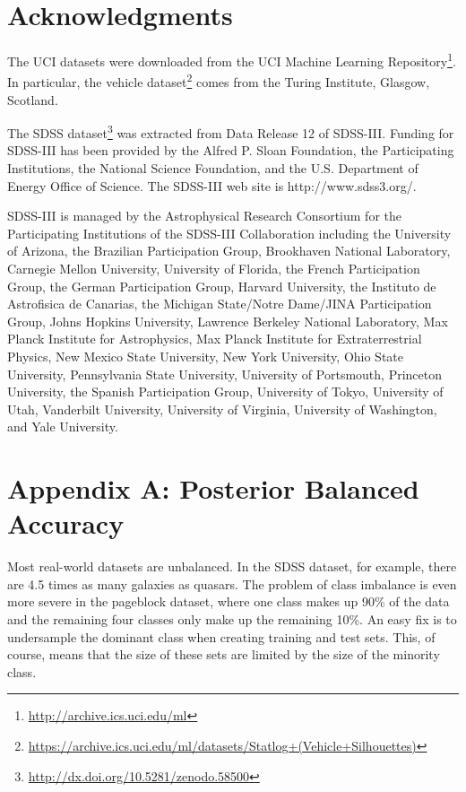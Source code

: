 \documentclass[fleqn,10pt,lineno]{wlpeerj} %
\begin{document}
\section{Acknowledgments}

The UCI datasets were downloaded from the UCI Machine Learning
Repository\footnote{\url{http://archive.ics.uci.edu/ml}}. In particular, the
vehicle
dataset\footnote{\url{https://archive.ics.uci.edu/ml/datasets/Statlog+(Vehicle+Silhouettes)}}
comes from the Turing Institute, Glasgow, Scotland.

The SDSS dataset\footnote{\url{http://dx.doi.org/10.5281/zenodo.58500}} was
extracted from Data Release 12 of SDSS-III. Funding for SDSS-III has been
provided by the Alfred P. Sloan Foundation, the Participating Institutions, the
National Science Foundation, and the U.S. Department of Energy Office of
Science. The SDSS-III web site is http://www.sdss3.org/.

SDSS-III is managed by the Astrophysical Research Consortium for the
Participating Institutions of the SDSS-III Collaboration including the
University of Arizona, the Brazilian Participation Group, Brookhaven National
Laboratory, Carnegie Mellon University, University of Florida, the French
Participation Group, the German Participation Group, Harvard University, the
Instituto de Astrofisica de Canarias, the Michigan State/Notre Dame/JINA
Participation Group, Johns Hopkins University, Lawrence Berkeley National
Laboratory, Max Planck Institute for Astrophysics, Max Planck Institute for
Extraterrestrial Physics, New Mexico State University, New York University,
Ohio State University, Pennsylvania State University, University of Portsmouth,
Princeton University, the Spanish Participation Group, University of Tokyo,
University of Utah, Vanderbilt University, University of Virginia, University
of Washington, and Yale University.





\pagebreak

\section*{Appendix A: Posterior Balanced Accuracy}


Most real-world datasets are unbalanced. In the SDSS dataset, for example,
there are 4.5 times as many galaxies as quasars. The problem of class imbalance
is even more severe in the pageblock dataset, where one class makes up 90\% of
the data and the remaining four classes only make up the remaining 10\%. An
easy fix is to undersample the dominant class when creating training and test
sets. This, of course, means that the size of these sets are limited by the
size of the minority class.
\end{document}
